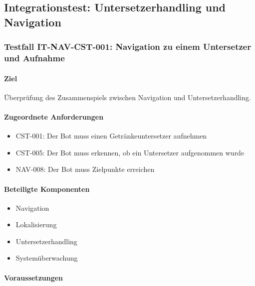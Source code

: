 \documentclass[
  a4paper,
  12pt,
  DIV=12,        %
  parskip=half,  %
  headings=small %
]{scrartcl}
\theoremstyle{definition}
\providecommand{\tightlist}{%
  \setlength{\itemsep}{0pt}\setlength{\parskip}{0pt}}
\theoremstyle{definition}
\begin{document}
\subsection{Integrationstest: Untersetzerhandling und
Navigation}\label{integrationstest-untersetzerhandling-und-navigation}

\subsubsection{Testfall IT-NAV-CST-001: Navigation zu einem Untersetzer
und
Aufnahme}\label{testfall-it-nav-cst-001-navigation-zu-einem-untersetzer-und-aufnahme}

\paragraph{Ziel}\label{ziel-13}

Überprüfung des Zusammenspiels zwischen Navigation und
Untersetzerhandling.

\paragraph{Zugeordnete
Anforderungen}\label{zugeordnete-anforderungen-13}

\begin{itemize}
\tightlist
\item
  CST-001: Der Bot muss einen Getränkeuntersetzer aufnehmen
\item
  CST-005: Der Bot muss erkennen, ob ein Untersetzer aufgenommen wurde
\item
  NAV-008: Der Bot muss Zielpunkte erreichen
\end{itemize}

\paragraph{Beteiligte Komponenten}\label{beteiligte-komponenten-4}

\begin{itemize}
\tightlist
\item
  Navigation
\item
  Lokalisierung
\item
  Untersetzerhandling
\item
  Systemüberwachung
\end{itemize}

\paragraph{Voraussetzungen}\label{voraussetzungen-13}
\end{document}
